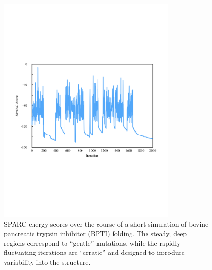 \documentclass[11pt,titlepage]{article}
\begin{document}
\begin{figure}
	\begin{center}
		\includegraphics[width=0.8\textwidth, trim=0 7cm 0 7cm, clip=true]{simulation_scores}
	\end{center}
	\caption{SPARC energy scores over the course of a short simulation of bovine pancreatic trypsin inhibitor (BPTI) folding. The steady, deep regions correspond to ``gentle'' mutations, while the rapidly fluctuating iterations are ``erratic'' and designed to introduce variability into the structure.}
	\label{simulation_scores}
\end{figure}
\end{document}
